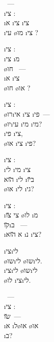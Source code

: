 ~—\\
\i{צי}  :\\
\i{א} \i{צי} \i{צי}\\
\i{עי} \o{מו} \i{צי} ?

\i{צי}  :\\
\i{צי} \i{מ} \\
\o{חו} ~—\\
\i{א}  \i{צי} \\
\o{חו} \o{או} ?

\i{צי}  :\\
\o{רו}\i{אי} \i{צי}  \i{פי}~—\\
 \o{יו}\i{עי} \i{מי}   \i{מי}?\\
\i{פי}  \i{צי},\\
\o{או} \i{צי}  \i{פי}?

\i{צי}  :\\
\i{לי}  \i{מי} \i{צי}\\
\u{הוא} \i{לי}  \i{ב}\u{יו}\\
\o{או} \i{לי} \i{גי}?

\i{צי}  :\\
\i{צי} \u{צו} \o{לו} \i{מ}\\
\u{קו}\i{ב} ~—\\
\i{א} \u{הוא} \i{נ} \i{צי}?

 \i{צי}\i{לי}\\
\o{שו}\i{לי} \o{שו}\i{לי}.\\
\i{צי}\i{לי} \o{שו}\i{לי}\\
\o{לו}  \i{צי}\i{לי}.

~—\\
\i{צי}  :\\
   \u{שו}~—\\
\i{א}  \i{ל}\o{או} \o{או}\\
\i{ב}?
